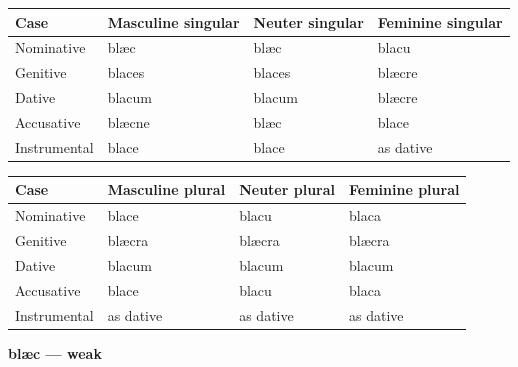 \par\begingroup
\fontsize{10.5}{13.2}\selectfont
\setlength{\LTleft}{0pt}\setlength{\LTright}{\fill}
\noindent
\begin{tabular}{@{}>{\raggedright\arraybackslash}p{22.0mm}>{\raggedright\arraybackslash}p{31.188mm}>{\raggedright\arraybackslash}p{31.188mm}>{\raggedright\arraybackslash}p{31.188mm}@{}}
\toprule
\textbf{Case} & \textbf{Masculine singular} & \textbf{Neuter singular} & \textbf{Feminine singular} \\
\midrule
Nominative & blæc & blæc & blacu \\
Genitive & blaces & blaces & blæcre \\
Dative & blacum & blacum & blæcre \\
Accusative & blæcne & blæc & blace \\
Instrumental & blace & blace & as dative \\
\bottomrule
\end{tabular}
\par\endgroup
\par\addvspace{5pt}
\par\begingroup
\fontsize{10.5}{13.2}\selectfont
\setlength{\LTleft}{0pt}\setlength{\LTright}{\fill}
\noindent
\begin{tabular}{@{}>{\raggedright\arraybackslash}p{22.0mm}>{\raggedright\arraybackslash}p{31.188mm}>{\raggedright\arraybackslash}p{31.188mm}>{\raggedright\arraybackslash}p{31.188mm}@{}}
\toprule
\textbf{Case} & \textbf{Masculine plural} & \textbf{Neuter plural} & \textbf{Feminine plural} \\
\midrule
Nominative & blace & blacu & blaca \\
Genitive & blæcra & blæcra & blæcra \\
Dative & blacum & blacum & blacum \\
Accusative & blace & blacu & blaca \\
Instrumental & as dative & as dative & as dative \\
\bottomrule
\end{tabular}
\par\endgroup

\textbf{blæc — weak}

